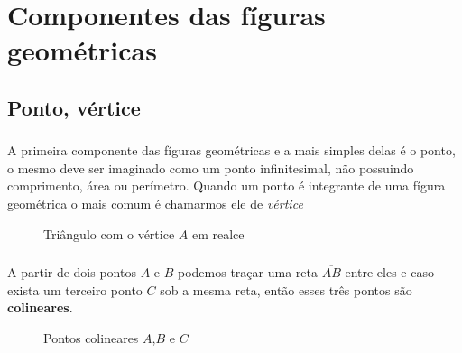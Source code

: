 \documentclass[handout]{beamer}
\begin{document}

\section{Componentes das fíguras geométricas}
\subsection{Ponto, vértice}
\begin{frame}\frametitle{\subsecname}
    A primeira componente das fíguras geométricas e a mais simples delas é o ponto, o mesmo deve ser imaginado como um
    ponto infinitesimal, não possuindo comprimento, área ou perímetro. Quando um ponto é integrante de uma fígura
    geométrica o mais comum é chamarmos ele de \textit{vértice}
    \begin{figure}[H]
        \centering
        \caption{Triângulo com o vértice $A$ em realce }
    \end{figure}

\end{frame}

\begin{frame}\frametitle{\subsecname}
    A partir de dois pontos $A$ e $B$ podemos traçar uma reta $\overline{AB}$ entre eles e caso exista um terceiro ponto $C$ sob a mesma reta,
    então esses três pontos são \textbf{colineares}.

    \begin{figure}[H]
        \centering
        \caption{Pontos colineares $A$,$B$ e $C$}
        \label{fig:reta_ab}
    \end{figure}
\end{frame}
\end{document}
